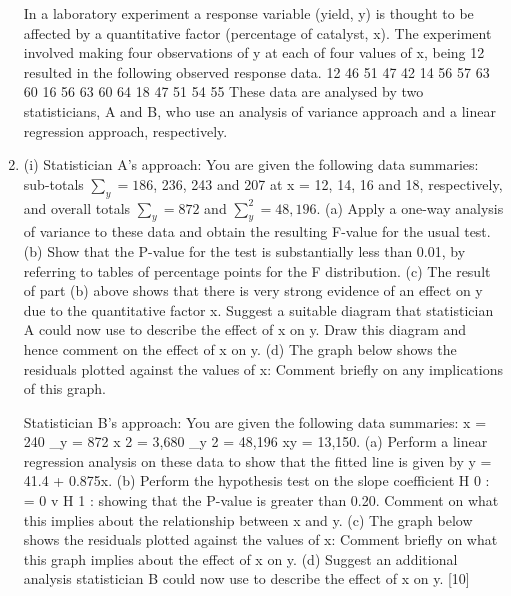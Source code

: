\documentclass[a4paper,12pt]{article}
\begin{document}
\begin{enumerate}

In a laboratory experiment a response variable (yield, y) is thought to be affected by a
quantitative factor (percentage of catalyst, x). The experiment involved making four
observations of y at each of four values of x, being 12%
resulted in the following observed response data.
12%
46
51
47
42
14%
56
57
63
60
16%
56
63
60
64
18%
47
51
54
55
These data are analysed by two statisticians, A and B, who use an analysis of variance
approach and a linear regression approach, respectively.
\item (i)
Statistician A’s approach:
You are given the following data summaries:
sub-totals $\sum_y = 186$, 236, 243 and 207 at x = 12, 14, 16 and 18,
respectively, and overall totals $\sum_y = 872$ and $\sum_y^2 = 48,196$.
(a) Apply a one-way analysis of variance to these data and obtain the
resulting F-value for the usual test.
(b) Show that the P-value for the test is substantially less than 0.01, by referring to tables of percentage points for the F distribution.
(c) The result of part (b) above shows that there is very strong evidence of
an effect on y due to the quantitative factor x. Suggest a suitable
diagram that statistician A could now use to describe the effect of x on
y. Draw this diagram and hence comment on the effect of x on y.
(d) The graph below shows the residuals plotted against the values of x:
Comment briefly on any implications of this graph.

Statistician B’s approach:
You are given the following data summaries:
\sum x = 240 \sum_y = 872 \sum x 2 = 3,680 \sum_y 2 = 48,196 \sum xy = 13,150.
(a) Perform a linear regression analysis on these data to show that the
fitted line is given by y = 41.4 + 0.875x.
(b) Perform the hypothesis test on the slope coefficient
H 0 : \beta = 0 v H 1 : \beta {}
showing that the P-value is greater than 0.20.
Comment on what this implies about the relationship between x and y.
(c)
The graph below shows the residuals plotted against the values of x:
Comment briefly on what this graph implies about the effect of x on y.
(d)
Suggest an additional analysis statistician B could now use to describe
the effect of x on y.
[10]
\newpage



\end{enumerate}
\end{document}
